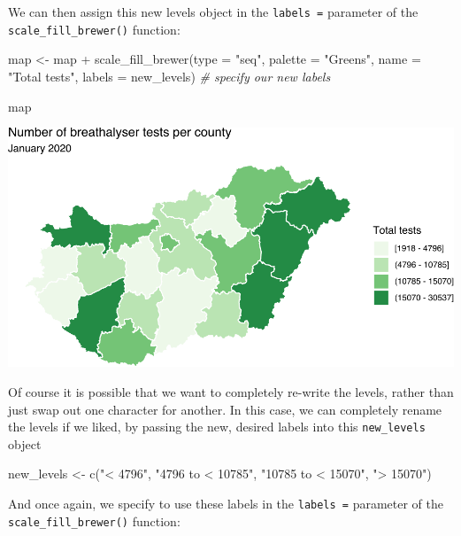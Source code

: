 \documentclass[
  krantz2]{krantz}
\makeatletter
\newenvironment{Shaded}{\begin{snugshade}}{\end{snugshade}}
\newcommand{\AttributeTok}[1]{\textcolor[rgb]{0.61,0.61,0.61}{#1}}
\newcommand{\CommentTok}[1]{\textcolor[rgb]{0.37,0.37,0.37}{\textit{#1}}}
\newcommand{\FunctionTok}[1]{\textcolor[rgb]{0,0,0}{#1}}
\newcommand{\NormalTok}[1]{#1}
\newcommand{\OtherTok}[1]{\textcolor[rgb]{0.37,0.37,0.37}{#1}}
\newcommand{\SpecialCharTok}[1]{\textcolor[rgb]{0,0,0}{#1}}
\newcommand{\StringTok}[1]{\textcolor[rgb]{0.5,0.5,0.5}{#1}}
\newenvironment{kframe}{%
\medskip{}
\setlength{\fboxsep}{.8em}
 \def\at@end@of@kframe{}%
 \ifinner\ifhmode%
  \def\at@end@of@kframe{\end{minipage}}%
  \begin{minipage}{\columnwidth}%
 \fi\fi%
 \def\FrameCommand##1{\hskip\@totalleftmargin \hskip-\fboxsep
 \colorbox{shadecolor}{##1}\hskip-\fboxsep
     \hskip-\linewidth \hskip-\@totalleftmargin \hskip\columnwidth}%
 \MakeFramed {\advance\hsize-\width
   \@totalleftmargin\z@ \linewidth\hsize
   \@setminipage}}%
 {\par\unskip\endMakeFramed%
 \at@end@of@kframe}
\renewenvironment{Shaded}{\begin{kframe}}{\end{kframe}}
\makeatother
\begin{document}
We can then assign this new levels object in the \texttt{labels\ =} parameter of the \texttt{scale\_fill\_brewer()} function:

\begin{Shaded}
\begin{Highlighting}[]
\NormalTok{map }\OtherTok{\textless{}{-}}\NormalTok{ map }\SpecialCharTok{+} 
  \FunctionTok{scale\_fill\_brewer}\NormalTok{(}\AttributeTok{type =} \StringTok{"seq"}\NormalTok{, }\AttributeTok{palette =} \StringTok{"Greens"}\NormalTok{, }
                    \AttributeTok{name =} \StringTok{"Total tests"}\NormalTok{, }
                    \AttributeTok{labels =}\NormalTok{ new\_levels)   }\CommentTok{\# specify our new labels}

\NormalTok{map}
\end{Highlighting}
\end{Shaded}

\includegraphics{crime_mapping_files/figure-latex/legendlabelsplot-1.pdf}

Of course it is possible that we want to completely re-write the levels, rather than just swap out one character for another. In this case, we can completely rename the levels if we liked, by passing the new, desired labels into this \texttt{new\_levels} object

\begin{Shaded}
\begin{Highlighting}[]
\NormalTok{new\_levels }\OtherTok{\textless{}{-}} \FunctionTok{c}\NormalTok{(}\StringTok{"\textless{} 4796"}\NormalTok{, }\StringTok{"4796 to \textless{} 10785"}\NormalTok{, }\StringTok{"10785  to \textless{} 15070"}\NormalTok{, }\StringTok{"\textgreater{} 15070"}\NormalTok{)}
\end{Highlighting}
\end{Shaded}

And once again, we specify to use these labels in the \texttt{labels\ =} parameter of the \texttt{scale\_fill\_brewer()} function:
\end{document}
